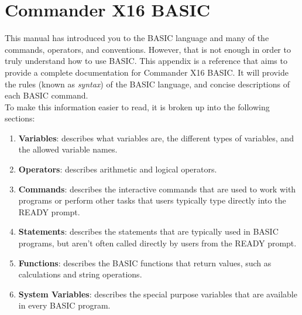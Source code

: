 \chapter*{Commander X16 BASIC}

This manual has introduced you to the BASIC language and many of the commands,
operators, and conventions.  However, that is not enough in order to truly
understand how to use BASIC.  This appendix is a reference that aims to provide
a complete documentation for Commander X16 BASIC.  It will provide the rules
(known as \emph{syntax}) of the BASIC language, and concise descriptions of
each BASIC command.\\

To make this information easier to read, it is broken up into the following
sections:\\

\begin{enumerate}

	\item {\bfseries Variables}: describes what variables are, the different
		types of variables, and the allowed variable names.

	\item {\bfseries Operators}: describes arithmetic and logical operators.

	\item {\bfseries Commands}: describes the interactive commands that are
		used to work with programs or perform other tasks that users typically
		type directly into the {\ttfamily READY} prompt.

	\item {\bfseries Statements}: describes the statements that are typically
		used in BASIC programs, but aren't often called directly by users from
		the {\ttfamily READY} prompt.

	\item {\bfseries Functions}: describes the BASIC functions that return
		values, such as calculations and string operations.

	\item {\bfseries System Variables}: describes the special purpose variables
		that are available in every BASIC program.

\end{enumerate}

\vspace{16pt}



